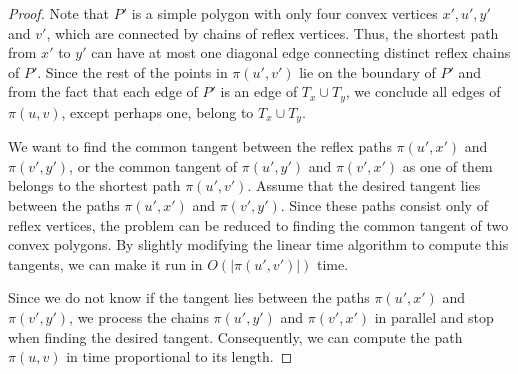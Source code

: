 \documentclass[a4paper,UKenglish]{lipics}
\newcommand{\p}[2]{\ensuremath{\pi(#1, #2)}}
\begin{document}
\begin{proof}
Note that $P'$ is a simple polygon with only four convex vertices $x',u', y'$ and $v'$, which are connected by chains of reflex vertices.
Thus, the shortest path from $x'$ to $y'$ can have at most one diagonal edge connecting distinct reflex chains of $P'$. Since the rest of the points in $\p{u'}{v'}$ lie on the boundary of $P'$ and from the fact that each edge of $P'$ is an edge of $T_x\cup T_y$, we conclude all edges of $\p{u}{v}$, except perhaps one, belong to $T_x\cup T_y$.

We want to find the common tangent between the reflex paths $\p{u'}{x'}$ and $\p{v'}{y'}$, or the common tangent of $\p{u'}{y'}$ and $\p{v'}{x'}$ as one of them belongs to the shortest path $\p{u'}{v'}$.
Assume that the desired tangent lies between the paths $\p{u'}{x'}$ and $\p{v'}{y'}$. 
Since these paths consist only of reflex vertices, the problem can be reduced to finding the common tangent of two convex polygons. 
By slightly modifying the linear time algorithm to compute this tangents, we can make it run in $O(|\p{u'}{v'}|)$ time.

Since we do not know if the tangent lies between the paths $\p{u'}{x'}$ and $\p{v'}{y'}$, we process the chains $\p{u'}{y'}$ and $\p{v'}{x'}$ in parallel and stop when finding the desired tangent. Consequently, we can compute the path $\p{u}{v}$ in time proportional to its length. 
\end{proof}
\end{document}
